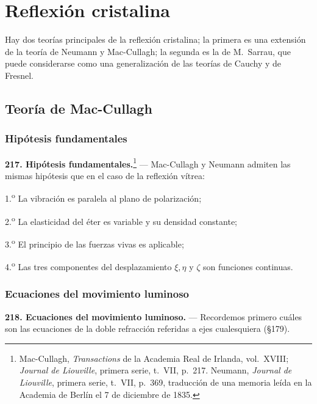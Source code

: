 \section{Reflexión cristalina}
\label{sec:reflexion-cristalina}

Hay dos teorías principales de la reflexión cristalina; la primera es una
extensión de la teoría de Neumann y Mac-Cullagh; la segunda es la de
M.~Sarrau, que puede considerarse como una generalización de las teorías
de Cauchy y de Fresnel.

\subsection{Teoría de Mac-Cullagh}
\label{sec:reflexion-mac-cullagh}

\subsubsection{Hipótesis fundamentales}

\noindent\textbf{217. Hipótesis fundamentales.}\footnote{Mac-Cullagh,
\emph{Transactions} de la Academia Real de Irlanda, vol.~XVIII;
\emph{Journal de Liouville}, primera serie, t.~VII, p.~217. Neumann,
\emph{Journal de Liouville}, primera serie, t.~VII, p.~369, traducción
de una memoria leída en la Academia de Berlín el 7 de diciembre de
1835.} — Mac-Cullagh y Neumann
admiten las mismas hipótesis que en el caso de la reflexión vítrea:

1.\textsuperscript{o} La vibración es paralela al plano de polarización;

2.\textsuperscript{o} La elasticidad del éter es variable y su densidad constante;

3.\textsuperscript{o} El principio de las fuerzas vivas es aplicable;

4.\textsuperscript{o} Las tres componentes del desplazamiento $\xi,\eta$ y $\zeta$ son
funciones continuas.

\subsubsection{Ecuaciones del movimiento luminoso}

\noindent\textbf{218. Ecuaciones del movimiento luminoso.} — Recordemos
primero cuáles son las ecuaciones de la doble refracción referidas a ejes
cualesquiera (§179).

